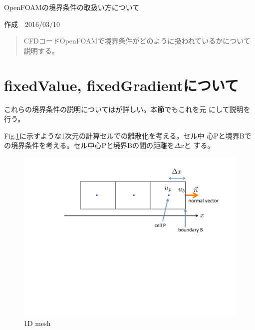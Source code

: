 \documentclass[a4paper,fleqn]{jsarticle}
\begin{document}
\thispagestyle{plain}
\begin{flushleft}
\begin{Large}
OpenFOAMの境界条件の取扱い方について
\end{Large}
\end{flushleft}

\begin{flushright}
作成　2016/03/10\\
\end{flushright}


\begin{abstract}
CFDコードOpenFOAMで境界条件がどのように扱われているかについて説明する。
\end{abstract}

\hrulefill



\section{fixedValue, fixedGradientについて}
これらの境界条件の説明については\cite{Nozaki}が詳しい。本節でもこれを元
にして説明を行う。

Fig.\ref{fig:cell}に示すような1次元の計算セルでの離散化を考える。セル中
心Pと境界Bでの境界条件を考える。セル中心Pと境界Bの間の距離を$\Delta x$と
する。
 \begin{figure}[htbp]
  \begin{center}
   \includegraphics[scale=0.4]{Fig/cell.pdf}
   \caption{1D mesh}
   \label{fig:cell}
  \end{center}
\end{figure}
\end{document}
